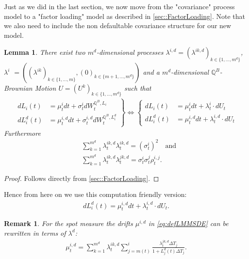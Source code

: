 \documentclass[12pt]{article}
\newtheorem{lemma}[theorem]{Lemma}
\newtheorem{remark}[theorem]{Remark}
\begin{document}
	Just as we did in the last section, we now move from the "covariance" process model to a "factor loading" model as described in \cref{sec::FactorLoading}. Note that we also need to include the non defaultable covariance structure for our new model.\\
	\begin{lemma}\label{lem:defLMMFactorVersion}
		There exist two $m^d$-dimensional processes $\lambda^{i,d} = (\lambda^{i k, d})_{k \in \{1, ..., m^d\}}$, $\lambda^{i}$ $= ((\lambda^{i k})_{k \in \{1, ..., m\}}, (0)_{k \in \{m+1, ..., m^d\}})$ and a $m^d $-dimensional $\mathbb{Q}^B$-Brownian Motion $U=(U^k)_{k \in \{1,...,m^d\}}$ such that
		\begin{align*}
			\left.
			\begin{aligned}
				dL_i(t) &= \mu^{i}_t dt + \sigma^{i}_t dW^{\mathbb{Q}^B, L_i}_t\\
				dL^d_i(t) &= \mu^{i, d}_t dt + \sigma^{i, d}_t dW^{\mathbb{Q}^B, L^d_i}_t
			\end{aligned}
			\right\}
			 \iff 
			 \left\{
			 \begin{aligned}
			 	dL_i(t) &= \mu^{i}_t dt + \lambda^{i}_t\cdot dU_t\\
			 	dL^d_i(t) &= \mu^{i, d}_t dt + \lambda^{i,d}_t\cdot dU_t
			 \end{aligned}
			 \right.
		\end{align*}
		Furthermore
		\begin{align*}
			&\sum_{k=1}^{m^d}\lambda^{i k, d}_t \lambda^{i k, d}_t = (\sigma^i_t)^2 \quad\text{and}\\
			&\sum_{k=1}^{m^d}\lambda^{i k, d}_t \lambda^{j k, d}_t = \sigma^i_t \sigma^j_t \rho^{i,j}_t.
		\end{align*}
	\end{lemma}
	\begin{proof}
		Follows directly from \cref{sec::FactorLoading}.
	\end{proof}
	Hence from here on we use this computation friendly version:
	\begin{align}\label{eq:defLMMSDE}
			dL^d_i(t) = \mu^{i, d}_t dt + \lambda^{i,d}_t\cdot dU_t.
	\end{align}
	\begin{remark}\label{rem:defLMMDrift}
		For the spot measure the drifts $\mu^{i,d}$ in \cref{eq:defLMMSDE} can be rewritten in terms of $\lambda^{d}$:
		\begin{align*}
			\mu^{i,d}_t = \sum_{k=1}^{m^d}\lambda^{i k, d}_t \sum_{j=m(t)}^{i}\frac{\lambda^{j k, d}_t\Delta T_j}{1 + L^d_j(t)\Delta T_j}.
		\end{align*}
	\end{remark}
\end{document}
